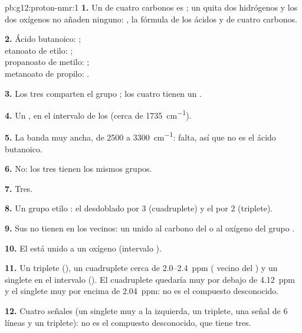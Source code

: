 \begin{solution}{pb:g12:proton-nmr:1}
\textbf{1.} Un  de cuatro carbonos es ; un 
quita dos hidrógenos y los dos oxígenos no añaden ninguno: ,
la fórmula de los ácidos y  de cuatro carbonos.

\textbf{2.} Ácido butanoico: ;\\
etanoato de etilo: ;\\
propanoato de metilo: ;\\
metanoato de propilo: .

\textbf{3.} Los tres  comparten el grupo ; los cuatro tienen
un .

\textbf{4.} Un , en el intervalo de los  (cerca de \qty{1735}{cm^{-1}}).

\textbf{5.} La banda  muy ancha, de 2500 a
\qty{3300}{cm^{-1}}: falta, así que no es el ácido butanoico.

\textbf{6.} No: los tres  tienen los mismos grupos.

\textbf{7.} Tres.

\textbf{8.} Un grupo etilo : el  desdoblado por 3
 (cuadruplete) y el  por 2 (triplete).

\textbf{9.} Sus  no tienen  en los  vecinos: un
 unido al carbono del  o al oxígeno del grupo .

\textbf{10.} El  está unido a un oxígeno (intervalo ).

\textbf{11.} Un triplete (), un cuadruplete cerca de 2.0--\qty{2.4}{ppm}
( vecino del ) y un singlete en el intervalo 
(). El cuadruplete quedaría muy por debajo de \qty{4.12}{ppm}
y el singlete muy por encima de \qty{2.04}{ppm}: no es el compuesto
desconocido.

\textbf{12.} Cuatro señales (un singlete muy a la izquierda, un
triplete, una señal de 6 líneas y un triplete): no es el compuesto
desconocido, que tiene tres.


\end{solution}
